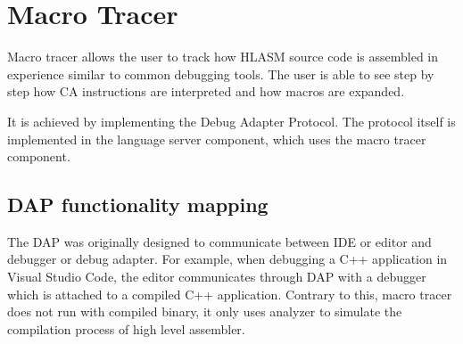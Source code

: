\chapter{Macro Tracer}

Macro tracer allows the user to track how HLASM source code is assembled in experience similar to common debugging tools. The user is able to see step by step how CA instructions are interpreted and how macros are expanded.

It is achieved by implementing the Debug Adapter Protocol. The protocol itself is implemented in the language server component, which uses the macro tracer component.

\section{DAP functionality mapping}

The DAP was originally designed to communicate between IDE or editor and debugger or debug adapter. For example, when debugging a C++ application in Visual Studio Code, the editor communicates through DAP with a debugger which is attached to a compiled C++ application.  Contrary to this, macro tracer does not run with compiled binary, it only uses analyzer to simulate the compilation process of high level assembler.

